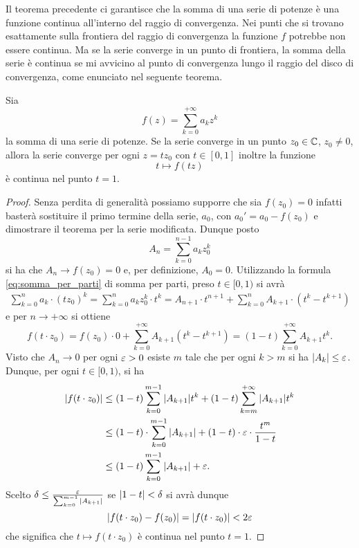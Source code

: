 Il teorema precedente ci garantisce che la somma di una serie di potenze
è una funzione continua all'interno del raggio di convergenza.
Nei punti che si trovano esattamente sulla frontiera del raggio di convergenza
la funzione $f$ potrebbe non essere continua.
Ma se la serie converge in un
punto di frontiera, la somma della serie è continua se mi avvicino al punto di
convergenza lungo il raggio del disco di convergenza, come enunciato nel seguente teorema.

\begin{theorem}
\mymark{*}
\label{th:lemma_abel}
Sia
\[
  f(z) = \sum_{k=0}^{+\infty} a_k z^k
\]
la somma di una serie di potenze. Se la serie converge in un punto $z_0\in \mathbb C$, $z_0\neq 0$, allora la serie converge per ogni $z=t z_0$ con $t\in [0,1]$ inoltre la funzione
\[
  t \mapsto f(tz)
\]
è continua nel punto $t=1$.
\end{theorem}
%
\begin{proof}
Senza perdita di generalità possiamo supporre che sia $f(z_0)=0$ infatti basterà sostituire il primo termine della serie, $a_0$, con $a_0' = a_0 - f(z_0)$ e dimostrare il teorema per la serie modificata.
Dunque posto
\[
  A_n = \sum_{k=0}^{n-1} a_k z_0^k
\]
si ha che $A_n \to f(z_0) = 0$ e, per definizione, $A_0 = 0$.
Utilizzando la formula \eqref{eq:somma_per_parti} di somma per parti, preso $t\in [0,1)$
si avrà
\begin{align*}
\sum_{k=0}^n a_k \cdot (tz_0)^k
= \sum_{k=0}^n a_k z_0^k \cdot t^k
= A_{n+1} \cdot t^{n+1} + \sum_{k=0}^n A_{k+1}\cdot (t^k - t^{k+1})
\end{align*}
e per $n\to +\infty$ si ottiene
\[
  f(t\cdot z_0) = f(z_0)\cdot 0 + \sum_{k=0}^{+\infty}A_{k+1}(t^k-t^{k+1})
  = (1-t)\sum_{k=0}^{+\infty} A_{k+1} t^k.
\]
Visto che $A_n \to 0$ per ogni $\varepsilon>0$ esiste $m$ tale che per ogni $k > m$ si ha ${\left|A_k\right|} \le  \varepsilon$. Dunque, per ogni $t\in [0,1)$, si ha
\begin{align*}
{\left|f(t\cdot z_0)\right|}
 &\le (1-t)\sum_{k=0}^{m-1} {\left|A_{k+1}\right|} t^k
  + (1-t)\sum_{k=m}^{+\infty} {\left|A_{k+1}\right|} t^k \\
 &\le (1-t)\cdot \sum_{k=0}^{m-1}{\left|A_{k+1}\right|} + (1-t)\cdot \varepsilon \cdot \frac{t^{m}}{1-t} \\
 &\le (1-t)\sum_{k=0}^{m-1}{\left|A_{k+1}\right|} + \varepsilon.
\end{align*}
Scelto $\delta \le \frac{\varepsilon} {\sum_{k=0}^{m-1} {\left|A_{k+1}\right|}}$ se ${\left|1-t\right|}<\delta$ si avrà
dunque
\[
  {\left|f(t\cdot z_0)-f(z_0)\right|} = {\left|f(t\cdot z_0)\right|} < 2\varepsilon
\]
che significa che $t\mapsto f(t\cdot z_0)$ è continua nel punto $t=1$.
\end{proof}


